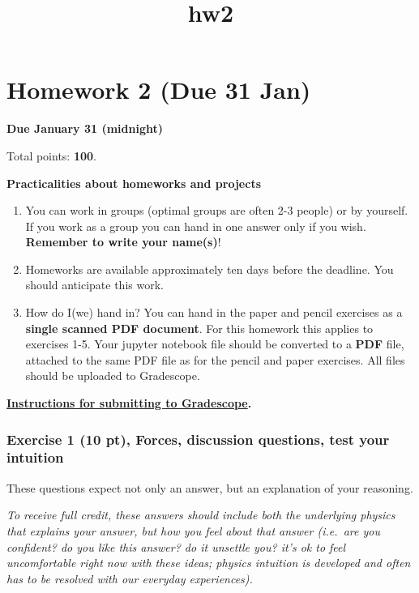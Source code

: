 \documentclass[11pt]{article}
\title{hw2}
\providecommand{\tightlist}{%
      \setlength{\itemsep}{0pt}\setlength{\parskip}{0pt}}
\begin{document}
    
    \maketitle
    
    

    
    \section{Homework 2 (Due 31 Jan)}\label{homework-2-due-31-jan}

\textbf{Due January 31 (midnight)}

Total points: \textbf{100}.

    \textbf{Practicalities about homeworks and projects}

\begin{enumerate}
\def\labelenumi{\arabic{enumi}.}
\tightlist
\item
  You can work in groups (optimal groups are often 2-3 people) or by
  yourself. If you work as a group you can hand in one answer only if
  you wish. \textbf{Remember to write your name(s)}!
\item
  Homeworks are available approximately ten days before the deadline.
  You should anticipate this work.
\item
  How do I(we) hand in? You can hand in the paper and pencil exercises
  as a \textbf{single scanned PDF document}. For this homework this
  applies to exercises 1-5. Your jupyter notebook file should be
  converted to a \textbf{PDF} file, attached to the same PDF file as for
  the pencil and paper exercises. All files should be uploaded to
  Gradescope.
\end{enumerate}

\textbf{\href{../resources/gradescope-submissions.md}{Instructions for
submitting to Gradescope}.}

    \subsubsection{Exercise 1 (10 pt), Forces, discussion questions, test
your
intuition}\label{exercise-1-10-pt-forces-discussion-questions-test-your-intuition}

These questions expect not only an answer, but an explanation of your
reasoning.

\emph{To receive full credit, these answers should include both the
underlying physics that explains your answer, but how you feel about
that answer (i.e.~are you confident? do you like this answer? do it
unsettle you? it's ok to feel uncomfortable right now with these ideas;
physics intuition is developed and often has to be resolved with our
everyday experiences).}
\end{document}
